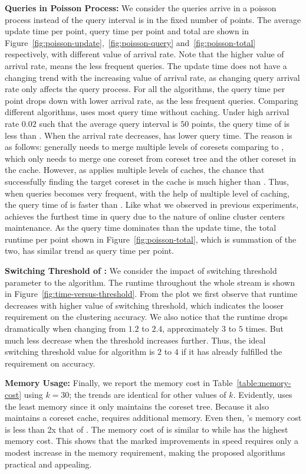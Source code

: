 \noindent\textbf{Queries in Poisson Process:}
We consider the queries arrive in a poisson process instead of the query interval is in the 
fixed number of points. The average update time per point, query time per point and total 
are shown in Figure~\ref{fig:poisson-update},~\ref{fig:poisson-query} 
and~\ref{fig:poisson-total} respectively, with different value of arrival rate. 
Note that the higher value of arrival rate, means the less frequent queries. 
The update time does not have a changing trend with the increasing value of arrival rate, 
as changing query arrival rate only affects the query process. For all the algorithms,
the query time per point drops down with lower arrival rate, as the less frequent queries. 
Comparing different algorithms, \skmpp uses most query time without caching. 
Under high arrival rate $0.02$ such that the average query interval is $50$ points, 
the query time of \rcc is less than \cc. When the arrival rate decreases, \cc has lower 
query time.  The reason is as follows: generally \rcc needs to merge multiple levels of 
coresets comparing to \cc, which only needs to merge one coreset from coreset tree and 
the other coreset in the cache. However, as \rcc applies multiple levels of caches, the chance that 
successfully finding the target coreset in the cache is much higher than \cc. Thus, when queries 
becomes very frequent, with the help of multiple level of caching, the query time of \rcc is faster than \cc.  
Like what we observed in previous experiments, \hybrid achieves the furthest time in query 
due to the nature of online cluster centers maintenance.
As the query time dominates than the update time, the total runtime per point shown in 
Figure~\ref{fig:poisson-total}, which is summation of the two, has similar trend as query time per point.

\noindent\textbf{Switching Threshold of \hybrid:}
We consider the impact of switching threshold parameter to the \hybrid algorithm.
The runtime throughout the whole stream is shown in Figure~\ref{fig:time-versus-threshold}. 
From the plot we first observe that runtime decreases with higher value of switching threshold, 
which indicates the looser requirement on the clustering accuracy. We also notice that the runtime 
drops dramatically when changing from $1.2$ to $2.4$, approximately $3$ to $5$ times. 
But much less decrease when the threshold increases further. Thus, the ideal switching threshold value 
for \hybrid algorithm is $2$ to $4$ if it has already fulfilled the requirement on accuracy.

\noindent\textbf{Memory Usage:} Finally, we report the memory cost in
Table~\ref{table:memory-cost} using $k=30$; the trends are identical for other
values of $k$. Evidently, \skmpp uses the least memory since it only maintains
the coreset tree. Because it also maintains a coreset cache, \cc requires
additional memory. Even then, \cc's memory cost is less than 2x that of
\skmpp. The memory cost of \hybrid is similar to \cc while \rcc has the highest
memory cost.  This shows that the marked improvements in speed requires only a
modest increase in the memory requirement, making the proposed algorithms
practical and appealing.
